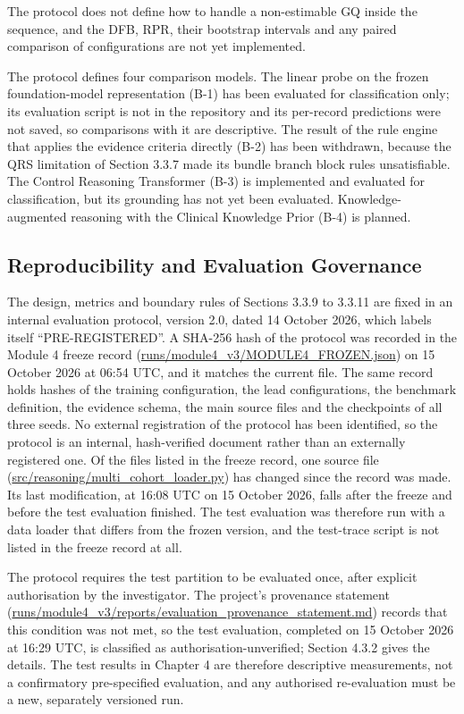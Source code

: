 The protocol does not define how to handle a non-estimable GQ inside the sequence, and the DFB, RPR, their bootstrap intervals and any paired comparison of configurations are not yet implemented.

The protocol defines four comparison models. The linear probe on the frozen foundation-model representation (B-1) has been evaluated for classification only; its evaluation script is not in the repository and its per-record predictions were not saved, so comparisons with it are descriptive. The result of the rule engine that applies the evidence criteria directly (B-2) has been withdrawn, because the QRS limitation of Section 3.3.7 made its bundle branch block rules unsatisfiable. The Control Reasoning Transformer (B-3) is implemented and evaluated for classification, but its grounding has not yet been evaluated. Knowledge-augmented reasoning with the Clinical Knowledge Prior (B-4) is planned.


\subsection{Reproducibility and Evaluation Governance}
The design, metrics and boundary rules of Sections 3.3.9 to 3.3.11 are fixed in an internal evaluation protocol, version 2.0, dated 14 October 2026, which labels itself ``PRE-REGISTERED''. A SHA-256 hash of the protocol was recorded in the Module 4 freeze record (\url{runs/module4_v3/MODULE4_FROZEN.json}) on 15 October 2026 at 06:54 UTC, and it matches the current file. The same record holds hashes of the training configuration, the lead configurations, the benchmark definition, the evidence schema, the main source files and the checkpoints of all three seeds. No external registration of the protocol has been identified, so the protocol is an internal, hash-verified document rather than an externally registered one. Of the files listed in the freeze record, one source file (\url{src/reasoning/multi_cohort_loader.py}) has changed since the record was made. Its last modification, at 16:08 UTC on 15 October 2026, falls after the freeze and before the test evaluation finished. The test evaluation was therefore run with a data loader that differs from the frozen version, and the test-trace script is not listed in the freeze record at all.

The protocol requires the test partition to be evaluated once, after explicit authorisation by the investigator. The project's provenance statement (\url{runs/module4_v3/reports/evaluation_provenance_statement.md}) records that this condition was not met, so the test evaluation, completed on 15 October 2026 at 16:29 UTC, is classified as authorisation-unverified; Section 4.3.2 gives the details. The test results in Chapter 4 are therefore descriptive measurements, not a confirmatory pre-specified evaluation, and any authorised re-evaluation must be a new, separately versioned run.
